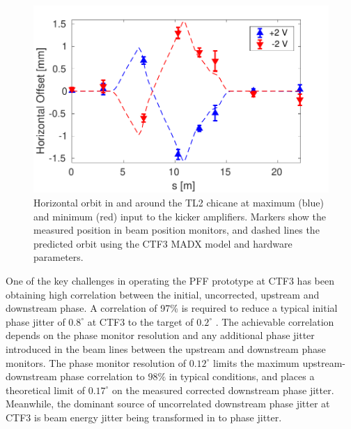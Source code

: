 \documentclass[%
 reprint,
superscriptaddress,
 amsmath,amssymb,
 prl,
]{revtex4-1}
\begin{document}
\begin{figure}
	\includegraphics[width=\columnwidth]{figs/orbClos}
	\caption{\label{fig:orbClos}Horizontal orbit in and around the TL2 chicane 
	at maximum (blue) and 
	minimum (red) 
	input to the kicker amplifiers. Markers show the measured position in beam 
	position monitors, and dashed lines the predicted orbit using the 
	CTF3 MADX model and hardware parameters.}
\end{figure}

One of the key challenges in operating the PFF prototype at CTF3 has been 
obtaining high correlation between the initial, uncorrected, upstream and 
downstream phase. 
A correlation of 97\% is required to reduce a typical initial 
phase jitter of \(0.8^\circ\) at CTF3 to the target of \(0.2^\circ\) 
\cite{RobertsThesis}. 
The achievable correlation depends on the phase monitor resolution and any 
additional phase jitter introduced in the beam lines between the upstream and 
downstream phase monitors. The phase monitor resolution of \(0.12^\circ\) 
limits the maximum upstream-downstream phase correlation to
\(98\%\) in typical conditions, and places a theoretical limit of
\(0.17^\circ\) on the measured corrected downstream phase 
jitter. 
Meanwhile, the dominant source of uncorrelated downstream phase jitter at CTF3 
is beam 
energy jitter being transformed in to phase jitter. 
\end{document}

